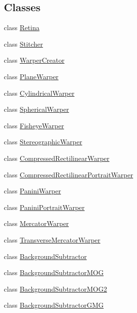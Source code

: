 \subsection*{Classes}
\begin{DoxyCompactItemize}
\item 
class \hyperlink{classcv_1_1Retina}{Retina}
\item 
class \hyperlink{classcv_1_1Stitcher}{Stitcher}
\item 
class \hyperlink{classcv_1_1WarperCreator}{Warper\-Creator}
\item 
class \hyperlink{classcv_1_1PlaneWarper}{Plane\-Warper}
\item 
class \hyperlink{classcv_1_1CylindricalWarper}{Cylindrical\-Warper}
\item 
class \hyperlink{classcv_1_1SphericalWarper}{Spherical\-Warper}
\item 
class \hyperlink{classcv_1_1FisheyeWarper}{Fisheye\-Warper}
\item 
class \hyperlink{classcv_1_1StereographicWarper}{Stereographic\-Warper}
\item 
class \hyperlink{classcv_1_1CompressedRectilinearWarper}{Compressed\-Rectilinear\-Warper}
\item 
class \hyperlink{classcv_1_1CompressedRectilinearPortraitWarper}{Compressed\-Rectilinear\-Portrait\-Warper}
\item 
class \hyperlink{classcv_1_1PaniniWarper}{Panini\-Warper}
\item 
class \hyperlink{classcv_1_1PaniniPortraitWarper}{Panini\-Portrait\-Warper}
\item 
class \hyperlink{classcv_1_1MercatorWarper}{Mercator\-Warper}
\item 
class \hyperlink{classcv_1_1TransverseMercatorWarper}{Transverse\-Mercator\-Warper}
\item 
class \hyperlink{classcv_1_1BackgroundSubtractor}{Background\-Subtractor}
\item 
class \hyperlink{classcv_1_1BackgroundSubtractorMOG}{Background\-Subtractor\-M\-O\-G}
\item 
class \hyperlink{classcv_1_1BackgroundSubtractorMOG2}{Background\-Subtractor\-M\-O\-G2}
\item 
class \hyperlink{classcv_1_1BackgroundSubtractorGMG}{Background\-Subtractor\-G\-M\-G}
\end{DoxyCompactItemize}
